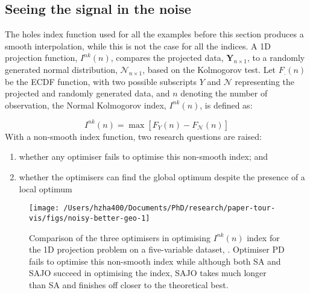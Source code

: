 \hypertarget{seeing-the-signal-in-the-noise}{%
\subsection{Seeing the signal in the
noise}\label{seeing-the-signal-in-the-noise}}

The holes index function used for all the examples before this section
produces a smooth interpolation, while this is not the case for all the
indices. A 1D projection function, \(I^{nk}(n)\), compares the projected
data, \(\mathbf{Y}_{n \times 1}\), to a randomly generated normal
distribution, \(\mathcal{N}_{n \times 1}\), based on the Kolmogorov
test. Let \(F_{.}(n)\) be the ECDF function, with two possible
subscripts \(Y\) and \(\mathcal{N}\) representing the projected and
randomly generated data, and \(n\) denoting the number of observation,
the Normal Kolmogorov index, \(I^{nk}(n)\), is defined as:

\[I^{nk}(n) = \max \left[F_{Y}(n) - F_{\mathcal{N}}(n)\right]\] With a
non-smooth index function, two research questions are raised:

\begin{enumerate}
\def\labelenumi{\arabic{enumi})}
\tightlist
\item
  whether any optimiser fails to optimise this non-smooth index; and
\item
  whether the optimisers can find the global optimum despite the
  presence of a local optimum
\end{enumerate}

\begin{Schunk}
\begin{figure}

{\centering \texttt{[image: /Users/hzha400/Documents/PhD/research/paper-tour-vis/figs/noisy-better-geo-1]} 

}

\caption[Comparison of the three optimisers in optimising $I^{nk}(n)$ index for the 1D projection problem on a five-variable dataset, ]{Comparison of the three optimisers in optimising $I^{nk}(n)$ index for the 1D projection problem on a five-variable dataset, . Optimiser PD fails to optimise this non-smooth index while although both SA and SAJO succeed in optimising the index, SAJO takes much longer than SA and finishes off closer to the theoretical best.}\label{fig:noisy-better-geo}
\end{figure}
\end{Schunk}

